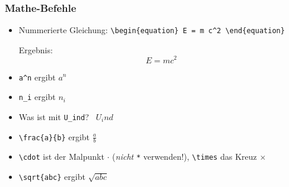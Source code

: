 \begin{frame}[<+->][fragile]
	\frametitle{Mathe-Befehle}
	
	\begin{itemize}
		\item Nummerierte Gleichung: \lstinline!\begin{equation} E = m c^2 \end{equation}!

		Ergebnis:
		\begin{equation}
		E = m c^2
		\end{equation}
		\item \lstinline!a^n! ergibt $a^n$
		\item \lstinline!n_i! ergibt $n_i$
		\item Was ist mit \lstinline!U_ind!? \textrightarrow\ $U_ind$
		\item \lstinline!\frac{a}{b}! ergibt $\displaystyle\frac{a}{b}$
		\item \lstinline!\cdot! ist der Malpunkt $\cdot$ (\emph{nicht} \lstinline!*! verwenden!), \lstinline!\times! das Kreuz $\times$
		\item \lstinline!\sqrt{abc}! ergibt $\sqrt{abc}$
	\end{itemize}
\end{frame}

